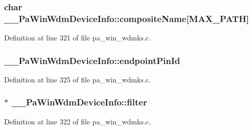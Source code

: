 \subsubsection[{\texorpdfstring{composite\+Name}{compositeName}}]{\setlength{\rightskip}{0pt plus 5cm}char \+\_\+\+\_\+\+Pa\+Win\+Wdm\+Device\+Info\+::composite\+Name\mbox{[}M\+A\+X\+\_\+\+P\+A\+TH\mbox{]}}\hypertarget{struct_____pa_win_wdm_device_info_a078805bd1a8e163820775d76673d0813}{}\label{struct_____pa_win_wdm_device_info_a078805bd1a8e163820775d76673d0813}


Definition at line 321 of file pa\+\_\+win\+\_\+wdmks.\+c.

\subsubsection[{\texorpdfstring{endpoint\+Pin\+Id}{endpointPinId}}]{ \+\_\+\+\_\+\+Pa\+Win\+Wdm\+Device\+Info\+::endpoint\+Pin\+Id}\hypertarget{struct_____pa_win_wdm_device_info_ad338338f56666dd11ecc1da66602fa5f}{}\label{struct_____pa_win_wdm_device_info_ad338338f56666dd11ecc1da66602fa5f}


Definition at line 325 of file pa\+\_\+win\+\_\+wdmks.\+c.

\subsubsection[{\texorpdfstring{filter}{filter}}]{$\ast$ \+\_\+\+\_\+\+Pa\+Win\+Wdm\+Device\+Info\+::filter}\hypertarget{struct_____pa_win_wdm_device_info_a6bb59c9cdcc8861941e589cf0558dfc4}{}\label{struct_____pa_win_wdm_device_info_a6bb59c9cdcc8861941e589cf0558dfc4}


Definition at line 322 of file pa\+\_\+win\+\_\+wdmks.\+c.

